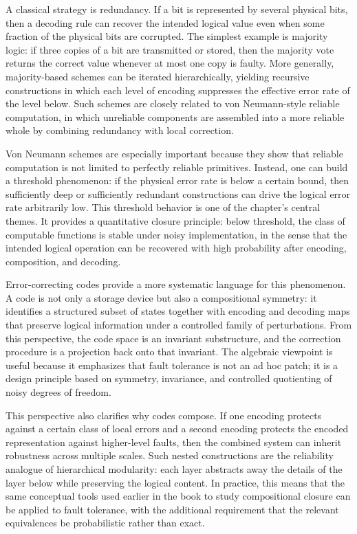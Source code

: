 \documentclass[11pt]{article}
\begin{document}
A classical strategy is redundancy. If a bit is represented by several physical bits, then a decoding rule can recover the intended logical value even when some fraction of the physical bits are corrupted. The simplest example is majority logic: if three copies of a bit are transmitted or stored, then the majority vote returns the correct value whenever at most one copy is faulty. More generally, majority-based schemes can be iterated hierarchically, yielding recursive constructions in which each level of encoding suppresses the effective error rate of the level below. Such schemes are closely related to von Neumann-style reliable computation, in which unreliable components are assembled into a more reliable whole by combining redundancy with local correction.

Von Neumann schemes are especially important because they show that reliable computation is not limited to perfectly reliable primitives. Instead, one can build a threshold phenomenon: if the physical error rate is below a certain bound, then sufficiently deep or sufficiently redundant constructions can drive the logical error rate arbitrarily low. This threshold behavior is one of the chapter's central themes. It provides a quantitative closure principle: below threshold, the class of computable functions is stable under noisy implementation, in the sense that the intended logical operation can be recovered with high probability after encoding, composition, and decoding.

Error-correcting codes provide a more systematic language for this phenomenon. A code is not only a storage device but also a compositional symmetry: it identifies a structured subset of states together with encoding and decoding maps that preserve logical information under a controlled family of perturbations. From this perspective, the code space is an invariant substructure, and the correction procedure is a projection back onto that invariant. The algebraic viewpoint is useful because it emphasizes that fault tolerance is not an ad hoc patch; it is a design principle based on symmetry, invariance, and controlled quotienting of noisy degrees of freedom.

This perspective also clarifies why codes compose. If one encoding protects against a certain class of local errors and a second encoding protects the encoded representation against higher-level faults, then the combined system can inherit robustness across multiple scales. Such nested constructions are the reliability analogue of hierarchical modularity: each layer abstracts away the details of the layer below while preserving the logical content. In practice, this means that the same conceptual tools used earlier in the book to study compositional closure can be applied to fault tolerance, with the additional requirement that the relevant equivalences be probabilistic rather than exact.
\end{document}
